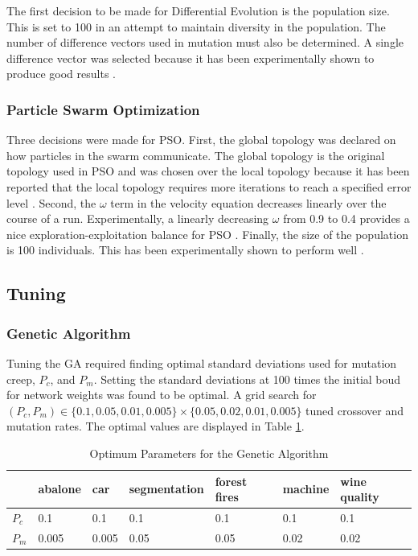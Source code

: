 \documentclass[twoside,11pt]{article}
\begin{document}
	The first decision to be made for Differential Evolution is the population size. This is set to 100 in an attempt to maintain diversity in the population.
	The number of difference vectors used in mutation must also be determined. 
	A single difference vector was selected because it has been experimentally shown to produce good results \citep{gamperle2002parameter}.

\subsubsection{Particle Swarm Optimization}

	Three decisions were made for PSO. First, the global topology was declared on how particles in the swarm communicate.
	The global topology is the original topology used in PSO and was chosen over the local topology because it has been reported that the local topology requires more iterations to reach a specified error level \citep{og-pso}.
	Second, the $\omega$ term in the velocity equation decreases linearly over the course of a run. Experimentally, a linearly decreasing $\omega$ from 0.9 to 0.4 provides a nice exploration-exploitation balance for PSO \citep{inertia}.
	Finally, the size of the population is 100 individuals. This has been experimentally shown to perform well \citep{empirical-pso}.

\subsection{Tuning}

\subsubsection{Genetic Algorithm}

	Tuning the GA required finding optimal standard deviations used for mutation creep, $P_c$, and $P_m$. Setting the standard deviations at 100 times the initial boud for network weights was found to be optimal. A grid search for $(P_c, P_m) \in \{0.1, 0.05, 0.01, 0.005\} \times \{0.05, 0.02, 0.01, 0.005\}$ tuned crossover and mutation rates. The optimal values are displayed in Table \ref{ga-tuning-table}.

	\begin{table}[h]
		\centering
		\begin{tabular}{|l|l|l|l|l|l|l|}
			\hline
			       & abalone & car & segmentation & forest fires & machine & wine quality  \\ \hline
			$P_c$  &     0.1 & 0.1 &          0.1 &          0.1 &     0.1 &          0.1  \\ \hline
			$P_m$  &   0.005 & 0.005 &       0.05 &         0.05 &    0.02 &         0.02  \\ \hline
		\end{tabular}
		\caption{Optimum Parameters for the Genetic Algorithm}
		\label{ga-tuning-table}
	\end{table}
\end{document}
